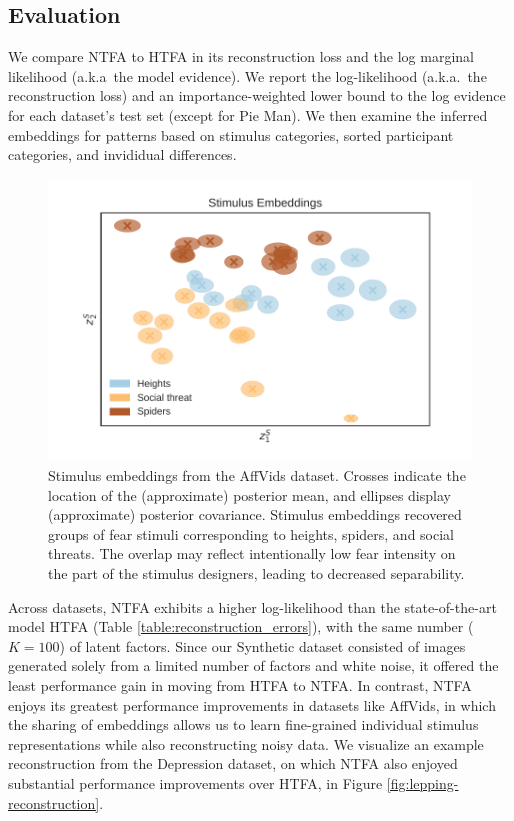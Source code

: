 \documentclass[twoside]{article}
\begin{document}
\subsection{Evaluation}
\label{subsec:evaluation}
\vspace{-1em}

We compare NTFA to HTFA in its reconstruction loss and the log marginal likelihood (a.k.a~the model evidence). We report the log-likelihood (a.k.a.~the reconstruction loss) and an importance-weighted lower bound to the log evidence for each dataset's test set (except for Pie Man).  We then examine the inferred embeddings for patterns based on stimulus categories, sorted participant categories, and invididual differences.
\begin{figure}[!t]
    \includegraphics[width=\columnwidth]{figures/affvids_norest_task_embedding.pdf}
    \caption{Stimulus embeddings from the AffVids dataset. Crosses indicate the location of the (approximate) posterior mean, and ellipses display (approximate) posterior covariance. Stimulus embeddings recovered groups of fear stimuli corresponding to heights, spiders, and social threats.  The overlap may reflect intentionally low fear intensity on the part of the stimulus designers, leading to decreased separability.}
    \label{fig:affvids-task-embeddings}
    \vspace{-1em}
\end{figure}
Across datasets, NTFA exhibits a higher log-likelihood than the state-of-the-art model HTFA (Table \ref{table:reconstruction_errors}), with the same number ($K=100$) of latent factors.  Since our Synthetic dataset consisted of images generated solely from a limited number of factors and white noise, it offered the least performance gain in moving from HTFA to NTFA.  In contrast, NTFA enjoys its greatest performance improvements in datasets like AffVids, in which the sharing of embeddings allows us to learn fine-grained individual stimulus representations while also reconstructing noisy data.  We visualize an example reconstruction from the Depression dataset, on which NTFA also enjoyed substantial performance improvements over HTFA, in Figure \ref{fig:lepping-reconstruction}.
\end{document}
